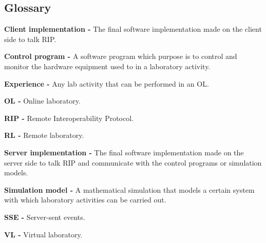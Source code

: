 \begin{appendices}

\chapter{Glossary}
\textbf{Client implementation -} The final software implementation made on the client side to talk RIP.

\textbf{Control program -} A software program which purpose is to control and monitor the hardware equipment used to in a laboratory activity.

\textbf{Experience -} Any lab activity that can be performed in an OL.

\textbf{OL -} Online laboratory.

\textbf{RIP -} Remote Interoperability Protocol.

\textbf{RL -} Remote laboratory.

\textbf{Server implementation -} The final software implementation made on the server side to talk RIP and communicate with the control programs or simulation models.

\textbf{Simulation model -} A mathematical simulation that models a certain system with which laboratory activities can be carried out.

\textbf{SSE -} Server-sent events.

\textbf{VL -} Virtual laboratory.

\end{appendices}


\renewcommand\bibname{References}
